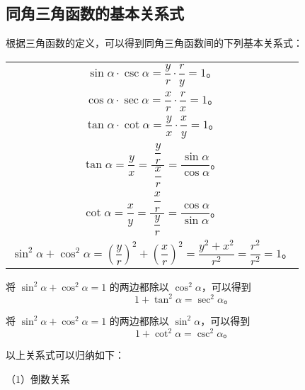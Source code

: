\subsection{同角三角函数的基本关系式}\label{subsec:2-4}

根据三角函数的定义，可以得到同角三角函数间的下列基本关系式：

\begin{table}[h]
\centering
\renewcommand\arraystretch{1.5}
\begin{tabular}{c}
    $\sin \alpha \cdot \csc \alpha = \dfrac y r \cdot \dfrac r y = 1 \text{。}$ \\
    $\cos \alpha \cdot \sec \alpha = \dfrac x r \cdot \dfrac r x = 1 \text{。}$ \\
    $\tan \alpha \cdot \cot \alpha = \dfrac y x \cdot \dfrac x y = 1 \text{。}$ \\
    \rule{0pt}{3em}$\tan \alpha = \dfrac y x = \dfrac{\; \dfrac y r \;}{\dfrac x r} = \dfrac{\sin \alpha}{\cos \alpha} \text{。}$ \\
    \rule{0pt}{3em}$\cot \alpha = \dfrac x y = \dfrac{\; \dfrac x r \;}{\dfrac y r} = \dfrac{\cos \alpha}{\sin \alpha} \text{。}$ \\
    \rule{0pt}{2em}$\sin^2 \alpha + \cos^2 \alpha = \left( \dfrac y r\right)^2 + \left( \dfrac x r\right)^2 = \dfrac{y^2 + x^2}{r^2} = \dfrac{r^2}{r^2} = 1 \text{。}$
\end{tabular}
\end{table}

将 $\sin^2 \alpha + \cos^2 \alpha = 1$ 的两边都除以 $\cos^2 \alpha$，可以得到
$$1 + \tan^2 \alpha = \sec^2 \alpha \text{。}$$

将 $\sin^2 \alpha + \cos^2 \alpha = 1$ 的两边都除以 $\sin^2 \alpha$，可以得到
$$1 + \cot^2 \alpha = \csc^2 \alpha \text{。}$$

以上关系式可以归纳如下：

（1）倒数关系

\begin{center}
\end{center}


